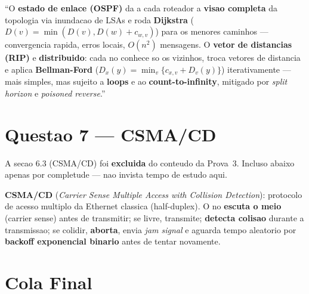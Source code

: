 \documentclass[11pt,a4paper]{article}
\begin{document}
\begin{resposta}
``O \textbf{estado de enlace (OSPF)} da a cada roteador a \textbf{visao completa} da topologia via inundacao de LSAs e roda \textbf{Dijkstra} ($D(v)=\min(D(v),D(w)+c_{w,v})$) para os menores caminhos --- convergencia rapida, erros locais, $O(n^2)$ mensagens. O \textbf{vetor de distancias (RIP)} e \textbf{distribuido}: cada no conhece so os vizinhos, troca vetores de distancia e aplica \textbf{Bellman-Ford} ($D_x(y)=\min_v\{c_{x,v}+D_v(y)\}$) iterativamente --- mais simples, mas sujeito a \textbf{loops} e ao \textbf{count-to-infinity}, mitigado por \textit{split horizon} e \textit{poisoned reverse}.''
\end{resposta}

\hrulefill

\section*{Questao 7 --- CSMA/CD }

\begin{nota}
A secao 6.3 (CSMA/CD) foi \textbf{excluida} do conteudo da Prova~3. Incluso abaixo apenas por completude --- nao invista tempo de estudo aqui.
\end{nota}

\textbf{CSMA/CD} (\textit{Carrier Sense Multiple Access with Collision Detection}): protocolo de acesso multiplo da Ethernet classica (half-duplex). O no \textbf{escuta o meio} (carrier sense) antes de transmitir; se livre, transmite; \textbf{detecta colisao} durante a transmissao; se colidir, \textbf{aborta}, envia \textit{jam signal} e aguarda tempo aleatorio por \textbf{backoff exponencial binario} antes de tentar novamente.

\hrulefill

\section*{Cola Final}
\end{document}
